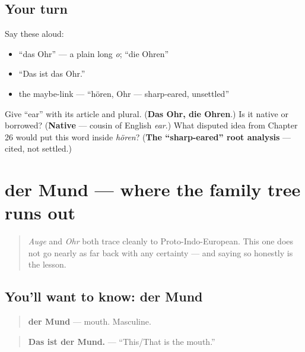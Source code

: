 \subsection*{Your turn}
Say these aloud:

\begin{itemize}
\raggedright
  \item \textquotedblleft{}das Ohr\textquotedblright{} — a plain long \emph{o}; \textquotedblleft{}die Ohren\textquotedblright{}
  \item \textquotedblleft{}Das ist das Ohr.\textquotedblright{}
  \item the maybe-link — \textquotedblleft{}hören, Ohr — sharp-eared, unsettled\textquotedblright{}
\end{itemize}

\begin{tcolorbox}[breakable,colback=teal!4,colframe=teal!35!black,title={Before you move on}]
Give \textquotedblleft{}ear\textquotedblright{} with its article and plural. (\textbf{Das Ohr, die Ohren}.) Is it native or borrowed? (\textbf{Native} — cousin of English \emph{ear}.) What disputed idea from Chapter 26 would put this word inside \emph{hören}? (\textbf{The \textquotedblleft{}sharp-eared\textquotedblright{} root analysis} — cited, not settled.)
\end{tcolorbox}
\section[der Mund]{der Mund — where the family tree runs out}

\label{lesson:GE-C30-mund}



\begin{quote}
\emph{Auge} and \emph{Ohr} both trace cleanly to Proto-Indo-European. This one does not go nearly as far back with any certainty — and saying so honestly is the lesson.
\end{quote}

\subsection*{You'll want to know: der Mund}
\begin{quote}
\textbf{der Mund} — mouth. Masculine.
\end{quote}

\begin{quote}
\textbf{Das ist der Mund.} — \textquotedblleft{}This/That is the mouth.\textquotedblright{}
\end{quote}

